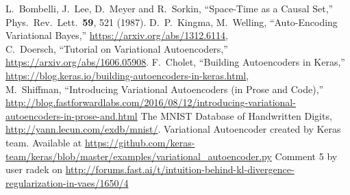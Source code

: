 \documentclass[letterpaper,10pt]{article}
\begin{document}
\begin{thebibliography}{99}
L.~Bombelli, J.~Lee, D.~Meyer and R.~Sorkin,
  ``Space-Time as a Causal Set,''
  Phys.\ Rev.\ Lett.\  {\bf 59}, 521 (1987).
D.~P.~Kingma, M.~Welling, ``Auto-Encoding Variational Bayes,'' \href{https://arxiv.org/abs/1312.6114}{https://arxiv.org/abs/1312.6114},\\
C.~Doersch, ``Tutorial on Variational Autoencoders,'' \href{https://arxiv.org/abs/1606.05908}{https://arxiv.org/abs/1606.05908}.
F.~Cholet, ``Building Autoencoders in Keras,'' \href{https://blog.keras.io/building-autoencoders-in-keras.html}{https://blog.keras.io/building-autoencoders-in-keras.html},\\
M.~Shiffman, ``Introducing Variational Autoencoders (in Prose and Code),'' \href{http://blog.fastforwardlabs.com/2016/08/12/introducing-variational-autoencoders-in-prose-and.html}
{http://blog.fastforwardlabs.com/2016/08/12/introducing-variational-autoencoders-in-prose-and.html}
 The MNIST Database of Handwritten Digits, \href{http://yann.lecun.com/exdb/mnist/}{http://yann.lecun.com/exdb/mnist/}.
 Variational Autoencoder created by Keras team. 
 Available at \href{https://github.com/keras-team/keras/blob/master/examples/variational_autoencoder.py}{https://github.com/keras-team/keras/blob/master/examples/variational\_autoencoder.py}
 Comment 5 by user radek on \href{http://forums.fast.ai/t/intuition-behind-kl-divergence-regularization-in-vaes/1650/4}
{http://forums.fast.ai/t/intuition-behind-kl-divergence-regularization-in-vaes/1650/4}
\end{thebibliography}
\end{document}
